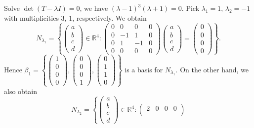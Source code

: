 \begin{Exercise}
\begin{enumerate}[(a)]
\begin{solution}
			Solve $\det(T-\lambda I) = 0$, we have $(\lambda-1)^3(\lambda+1) = 0$. Pick $\lambda_1 = 1$, $\lambda_2 = -1$ with multiplicities $3$, $1$, respectively. We obtain
			$$
			N_{\lambda_1} = \left\{\begin{pmatrix}
			a \\
			b \\
			c \\
			d
			\end{pmatrix}\in\mathbb{R}^4:\begin{pmatrix}
			0 & 0 & 0 & 0 \\
			0 & -1 & 1 & 0 \\
			0 & 1 & -1 & 0 \\
			0 & 0 & 0 & 0
			\end{pmatrix} \begin{pmatrix}
			a \\
			b \\
			c \\
			d
			\end{pmatrix} = \begin{pmatrix}
			0 \\
			0 \\
			0 \\
			0
			\end{pmatrix} \right\}.
			$$
			Hence $\beta_1 = \left\{\begin{pmatrix}
			1 \\
			0 \\
			0 \\
			0
			\end{pmatrix},\begin{pmatrix}
			0 \\
			0 \\
			0 \\
			1
			\end{pmatrix},\begin{pmatrix}
			0 \\
			1 \\
			1 \\
			0
			\end{pmatrix}\right\}$ is a basis for $N_{\lambda_1}$. On the other hand, we also obtain
			$$
			N_{\lambda_2} = \left\{\begin{pmatrix}
			a \\
			b \\
			c \\
			d
			\end{pmatrix}\in\mathbb{R}^4:\begin{pmatrix}
			2 & 0 & 0 & 0 \\

\end{pmatrix}$$
\end{solution}
\end{enumerate}
\end{Exercise}
